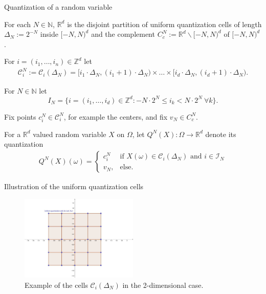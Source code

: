 \begin{frame}{Quantization of a random variable}
\bit
\item For each $N\in\mathbb{N}$,  $\mathbb{R}^d$ is the disjoint partition of uniform quantization cells of length $\Delta_N:=2^{-N}$
inside $[-N,N)^d$ and the complement $C_{c}^N:=\mathbb{R}^d\backslash [-N,N)^d$ of $[-N,N)^d$.
\item For $i=(i_1,\dots,i_n)\in\mathbb{Z}^d$ let
\begin{align}\label{UniQuantCells}
\mathcal{C}_i^{N}:=\mathcal{C}_i(\Delta_N)= [i_1\cdot\Delta_N,(i_1+1)\cdot\Delta_N)\times\dots\times[i_d\cdot\Delta_N,(i_d+1)\cdot\Delta_N). 
\end{align}
\item For $N\in\mathbb{N}$ let  
\[
I_N=\{i=(i_1,\dots,i_d)\in\mathbb{Z}^d\colon -N\cdot 2^N\leq i_k< N\cdot 2^N\:\forall k\}.
\] 
\item Fix points $c_i^N\in\mathcal{C}_i^N$, for example the centers, and fix $v_N\in C_{c}^N$. 
\item For a $\mathbb{R}^d$ valued random variable $X$ on $\Omega$, let $Q^N(X):\Omega\to\mathbb{R}^d$ denote its quantization 
\begin{align}\label{EqQuantization}
Q^N(X)(\omega)=
\begin{cases}c_i^N & \text{if $X(\omega)\in\mathcal{C}_i(\Delta_N)$ and $i\in\mathcal{I}_N$} 
\\ v_N, &\text{else. } 
\end{cases}
\end{align}
\eit
\end{frame}

\begin{frame}{Illustration of the uniform quantization cells}
\begin{figure}
\centering
\includegraphics[width=0.50\textwidth]{RD_IV/UniformSpecialcells.png}
\captionsetup{labelformat=empty}
\caption{Example of the cells $\mathcal{C}_i(\Delta_N)$ in the 2-dimensional case.  
}
\end{figure}
\end{frame}

